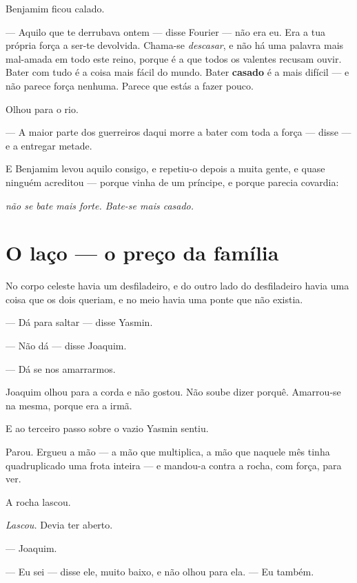 \documentclass[livro.tex]{subfiles}
\begin{document}
\medskip

Benjamim ficou calado.

--- Aquilo que te derrubava ontem --- disse Fourier --- não era eu. Era a tua própria força a ser-te devolvida.
Chama-se \emph{descasar}, e não há uma palavra mais mal-amada em todo este reino, porque é a que todos os valentes
recusam ouvir. Bater com tudo é a coisa mais fácil do mundo. Bater \textbf{casado} é a mais difícil --- e não
parece força nenhuma. Parece que estás a fazer pouco.

Olhou para o rio.

--- A maior parte dos guerreiros daqui morre a bater com toda a força --- disse --- e a entregar metade.

\medskip

E Benjamim levou aquilo consigo, e repetiu-o depois a muita gente, e quase ninguém acreditou --- porque vinha de um
príncipe, e porque parecia covardia:

\begin{center}\itshape
não se bate mais forte. Bate-se mais casado.
\end{center}


\chapter{O laço --- o preço da família}

No corpo celeste havia um desfiladeiro, e do outro lado do desfiladeiro havia uma coisa que os dois queriam, e no
meio havia uma ponte que não existia.

--- Dá para saltar --- disse Yasmin.

--- Não dá --- disse Joaquim.

--- Dá se nos amarrarmos.

Joaquim olhou para a corda e não gostou. Não soube dizer porquê. Amarrou-se na mesma, porque era a irmã.

\medskip

E ao terceiro passo sobre o vazio Yasmin sentiu.

Parou. Ergueu a mão --- a mão que multiplica, a mão que naquele mês tinha quadruplicado uma frota inteira --- e
mandou-a contra a rocha, com força, para ver.

A rocha lascou.

\emph{Lascou.} Devia ter aberto.

--- Joaquim.

--- Eu sei --- disse ele, muito baixo, e não olhou para ela. --- Eu também.
\end{document}
